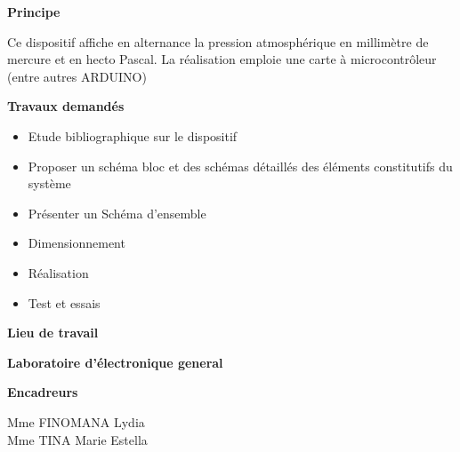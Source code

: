 \documentclass[a4paper,12pt]{report}
\begin{document}
\begin{center}
\hspace{-15cm}
\textbf{Principe} \\[5mm]
\begin{flushleft}
Ce dispositif affiche en alternance la pression atmosphérique en
millimètre de mercure et en hecto Pascal.
La réalisation emploie une carte à microcontrôleur (entre autres ARDUINO) \\ [3mm]
\end{flushleft}

\hspace{-13cm}
\textbf{Travaux demandés} \\[5mm]

\begin{itemize}
  \item[\ding{118}] Etude bibliographique sur le dispositif \\ [5mm]
   \item[\ding{118}]Proposer un schéma bloc et des schémas détaillés des éléments constitutifs du
système \\[5mm]
    \item[\ding{118}]Présenter un Schéma d’ensemble \\[5mm]
    \item[\ding{118}]Dimensionnement\\[5mm]
     \item[\ding{118}] Réalisation\\[5mm]
     \item[\ding{118}] Test et essais \\[5mm]
\end{itemize}


\renewcommand*{\FrenchLabelItem}{$\bullet$} %

\hspace{-14cm}
\textbf{Lieu de travail}\\[5mm]
\begin{flushleft}
  \textbf{Laboratoire d'électronique general} \\ [5mm]
	
	 
\end{flushleft}

\hspace{-14.8cm}
\textbf{Encadreurs}\\[5mm]
\begin{flushleft}
	Mme FINOMANA Lydia \\[5mm]
	Mme TINA Marie Estella
\end{flushleft}



\end{center}
\end{document}
